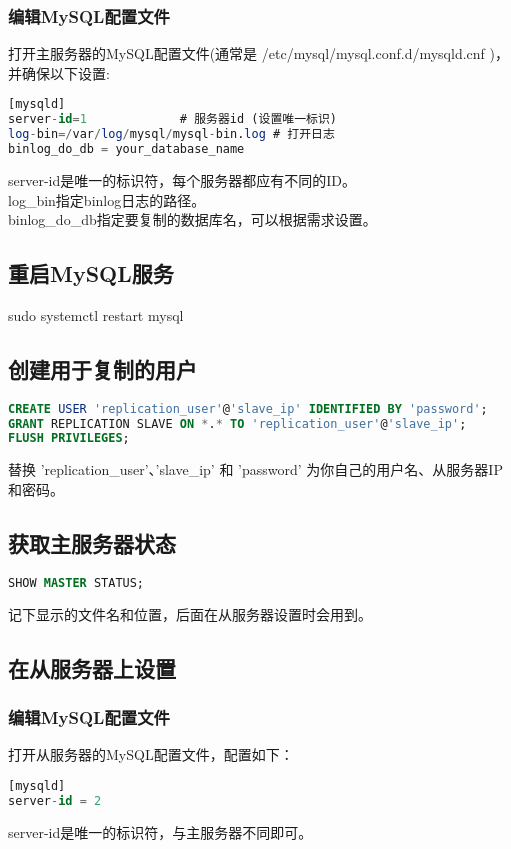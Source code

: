 \documentclass[12pt,twiside,a4paper]{book}
\numberwithin{chapter}{part}
\begin{document}
\subsubsection{编辑MySQL配置文件}
打开主服务器的MySQL配置文件(通常是 /etc/mysql/mysql.conf.d/mysqld.cnf )，并确保以下设置:\\
\begin{lstlisting}[language=sql,breaklines = true]
[mysqld]
server-id=1             # 服务器id (设置唯一标识)
log-bin=/var/log/mysql/mysql-bin.log # 打开日志
binlog_do_db = your_database_name
\end{lstlisting}
server-id是唯一的标识符，每个服务器都应有不同的ID。\\
log\_bin指定binlog日志的路径。\\
binlog\_do\_db指定要复制的数据库名，可以根据需求设置。
\subsection{重启MySQL服务}
sudo systemctl restart mysql
\subsection{创建用于复制的用户}
\begin{lstlisting}[language=sql,breaklines = true]
CREATE USER 'replication_user'@'slave_ip' IDENTIFIED BY 'password';
GRANT REPLICATION SLAVE ON *.* TO 'replication_user'@'slave_ip';
FLUSH PRIVILEGES;
\end{lstlisting}
替换 'replication\_user'、'slave\_ip' 和 'password' 为你自己的用户名、从服务器IP和密码。
\subsection{获取主服务器状态}
\begin{lstlisting}[language=sql,breaklines = true]
SHOW MASTER STATUS;
\end{lstlisting}
记下显示的文件名和位置，后面在从服务器设置时会用到。\\
\subsection{在从服务器上设置}
\subsubsection{编辑MySQL配置文件}
打开从服务器的MySQL配置文件，配置如下：\\
\begin{lstlisting}[language=sql,breaklines = true]
[mysqld]
server-id = 2
\end{lstlisting}
server-id是唯一的标识符，与主服务器不同即可。
\end{document}
